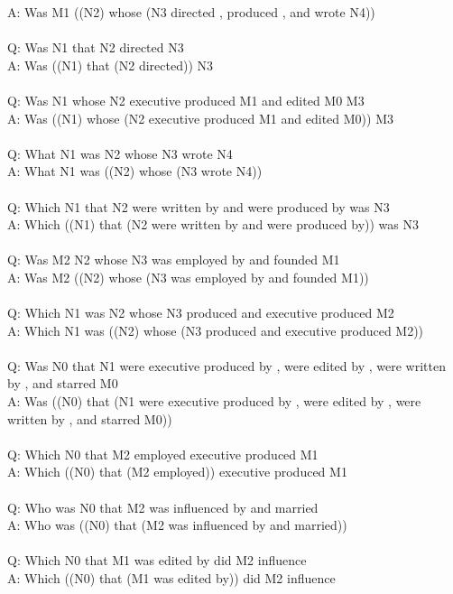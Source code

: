 \documentclass{article} \usepackage{iclr2022_conference,times}
\begin{document}
{A: Was M1 ((N2) whose (N3 directed , produced , and wrote N4)) \\
 \\
Q: Was N1 that N2 directed N3 \\
A: Was ((N1) that (N2 directed)) N3 \\
 \\
Q: Was N1 whose N2 executive produced M1 and edited M0 M3 \\
A: Was ((N1) whose (N2 executive produced M1 and edited M0)) M3 \\
 \\
Q: What N1 was N2 whose N3 wrote N4 \\
A: What N1 was ((N2) whose (N3 wrote N4)) \\
 \\
Q: Which N1 that N2 were written by and were produced by was N3 \\
A: Which ((N1) that (N2 were written by and were produced by)) was N3 \\
 \\
Q: Was M2 N2 whose N3 was employed by and founded M1 \\
A: Was M2 ((N2) whose (N3 was employed by and founded M1)) \\
 \\
Q: Which N1 was N2 whose N3 produced and executive produced M2 \\
A: Which N1 was ((N2) whose (N3 produced and executive produced M2)) \\
 \\
Q: Was N0 that N1 were executive produced by , were edited by , were written by , and starred M0 \\
A: Was ((N0) that (N1 were executive produced by , were edited by , were written by , and starred M0)) \\
 \\
Q: Which N0 that M2 employed executive produced M1 \\
A: Which ((N0) that (M2 employed)) executive produced M1 \\
 \\
Q: Who was N0 that M2 was influenced by and married \\
A: Who was ((N0) that (M2 was influenced by and married)) \\
 \\
Q: Which N0 that M1 was edited by did M2 influence \\
A: Which ((N0) that (M1 was edited by)) did M2 influence \\
 \\
}
\end{document}
